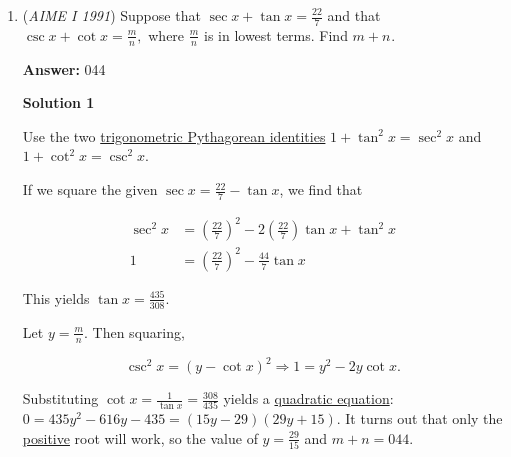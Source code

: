 \begin{enumerate}
 Which implies that $b^2 + 144$ is a \href{https://artofproblemsolving.com/wiki/index.php?title=Perfect\_square}{perfect square} also (let this be $c^2$). Then 

 
 \[c^2 - b^2 = 144 \Longrightarrow (c+b)(c-b) = 144\]

 The pairs of factors of $144$ are $(\pm1,\pm144),( \pm 2, \pm 72),( \pm 3, \pm 48),( \pm 4, \pm 36),( \pm 6, \pm 24),( \pm 8, \pm 18),( \pm 9, \pm 16),( \pm 12, \pm 12)$; since $c$ is the \href{https://artofproblemsolving.com/wiki/index.php?title=Mean}{average} of each respective pair and is also an integer, the pairs that work must have the same \href{https://artofproblemsolving.com/wiki/index.php?title=Parity}{parity}. Thus we get $\boxed{10}$ pairs (counting positive and negative) of factors that work, and substituting them backwards show that they all work.

 


	\item (\textit{AIME I 1991}) Suppose that $\sec x+\tan x=\frac{22}7$ and that $\csc x+\cot x=\frac mn,$ where $\frac mn$ is in lowest terms.  Find $m+n^{}_{}.$

 \textbf{Answer: }044



\textbf{Solution 1}

Use the two \href{https://artofproblemsolving.com/wiki/index.php?title=Trigonometric\_identities\#Pythagorean\_Identities}{trigonometric Pythagorean identities} $1 + \tan^2 x = \sec^2 x$ and $1 + \cot^2 x = \csc^2 x$. 

 If we square the given $\sec x = \frac{22}{7} - \tan x$, we find that 

 
 \begin{align*} \sec^2 x &= \left(\frac{22}7\right)^2 - 2\left(\frac{22}7\right)\tan x + \tan^2 x \\ 1 &= \left(\frac{22}7\right)^2 - \frac{44}7 \tan x \end{align*}


 This yields $\tan x = \frac{435}{308}$. 

 Let $y = \frac mn$. Then squaring, 

 
 \[\csc^2 x = (y - \cot x)^2 \Longrightarrow 1 = y^2 - 2y\cot x.\] 

 Substituting $\cot x = \frac{1}{\tan x} = \frac{308}{435}$ yields a \href{https://artofproblemsolving.com/wiki/index.php?title=Quadratic\_equation}{quadratic equation}: $0 = 435y^2 - 616y - 435 = (15y - 29)(29y + 15)$. It turns out that only the \href{https://artofproblemsolving.com/wiki/index.php?title=Positive}{positive} root will work, so the value of $y = \frac{29}{15}$ and $m + n = \boxed{044}$.


\end{enumerate}

